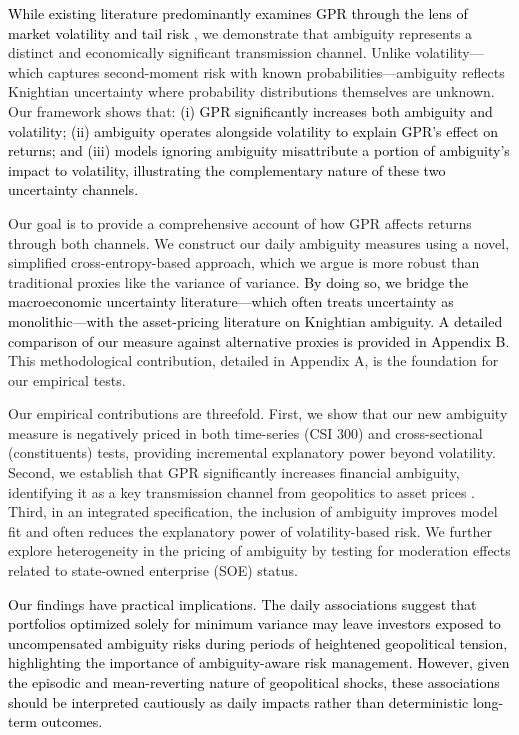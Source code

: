 \documentclass[preprint,12pt,authoryear]{elsarticle}
\begin{document}
\textcolor{black}{While existing literature predominantly examines GPR through the lens of market volatility \citep{Liu2024} and tail risk \citep{Salisu2021}}, we demonstrate that ambiguity represents a distinct and economically significant transmission channel. Unlike volatility---which captures second-moment risk with known probabilities---ambiguity reflects Knightian uncertainty where probability distributions themselves are unknown. Our framework shows that: \textcolor{black}{(i) GPR significantly increases both ambiguity and volatility; (ii) ambiguity operates alongside volatility to explain GPR's effect on returns; and (iii) models ignoring ambiguity misattribute a portion of ambiguity's impact to volatility, illustrating the complementary nature of these two uncertainty channels.}

Our goal is to provide a comprehensive account of how GPR affects returns through both channels. We construct our daily ambiguity measures using a novel, simplified cross-entropy-based approach, which we argue is more robust than traditional proxies like the variance of variance. \textcolor{black}{By doing so, we bridge the macroeconomic uncertainty literature---which often treats uncertainty as monolithic---with the asset-pricing literature on Knightian ambiguity. A detailed comparison of our measure against alternative proxies is provided in Appendix B.} This methodological contribution, detailed in Appendix A, is the foundation for our empirical tests.

Our empirical contributions are threefold. First, we show that our new ambiguity measure is negatively priced in both time-series (CSI 300) and cross-sectional (constituents) tests, providing incremental explanatory power beyond volatility. Second, we establish that GPR significantly increases financial ambiguity, identifying it as a key transmission channel from geopolitics to asset prices \citep{Caldara2022}. Third, in an integrated specification, the inclusion of ambiguity improves model fit and often reduces the explanatory power of volatility-based risk. We further explore heterogeneity in the pricing of ambiguity by testing for moderation effects related to state-owned enterprise (SOE) status.

\textcolor{black}{Our findings have practical implications. The daily associations suggest that portfolios optimized solely for minimum variance may leave investors exposed to uncompensated ambiguity risks during periods of heightened geopolitical tension, highlighting the importance of ambiguity-aware risk management. However, given the episodic and mean-reverting nature of geopolitical shocks, these associations should be interpreted cautiously as daily impacts rather than deterministic long-term outcomes.}
\end{document}
